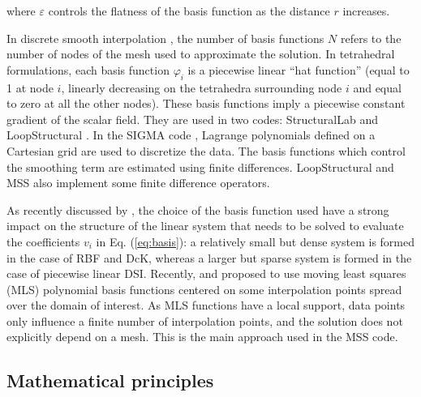 \documentclass[preprint]{ring20}
\begin{document}
where $\varepsilon$ controls the flatness of the basis function as the distance $r$ increases. 

In discrete smooth interpolation \citep[DSI, ][]{Frank2007CG,Caumon2013GaRSITo,Souche20137ECEISE2,Laurent2016MG,Irakarama2021MG}, the number of basis functions $N$ refers to the number of nodes of the mesh used to approximate the solution. In tetrahedral formulations, each basis function $\varphi_i$ is a piecewise linear ``hat function'' (equal to 1 at node $i$, linearly decreasing on the tetrahedra surrounding node $i$ and equal to zero at all the other nodes). These basis functions imply a piecewise constant gradient of the scalar field. They are used in two codes: StructuralLab \citep{Frank2007CG,Caumon2013GaRSITo} and LoopStructural \citep{Grose2021GMDa}. 
In the SIGMA code \cite{Irakarama2021MG}, Lagrange polynomials defined on a Cartesian grid are used to discretize the data. The basis functions which control the smoothing term are estimated using finite differences. LoopStructural and MSS also implement some finite difference operators. 

As recently discussed by \citet{Renaudeau2019MG}, the choice of the basis function used have a strong impact on the structure of the linear system that needs to be solved to evaluate the coefficients $v_i$ in Eq. (\ref{eq:basis}): a relatively small but dense system is formed in the case of RBF and DcK, whereas a larger but sparse system is formed in the case of piecewise linear DSI. Recently, \citet{Renaudeau2019MG} and \citet{Manchuk2019CG} proposed to use moving least squares (MLS) polynomial basis functions centered on some interpolation points spread over the domain of interest. As MLS functions have a local support, data points only influence a finite number of interpolation points, and the solution does not explicitly depend on a mesh. This is the main approach used in the MSS code. 

\subsection{Mathematical principles} 
\end{document}
